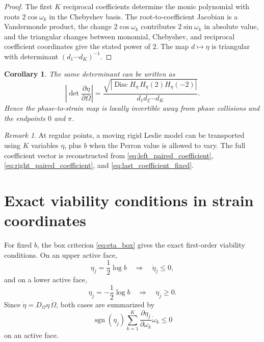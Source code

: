 \documentclass[11pt]{amsart}
\numberwithin{equation}{section}
\theoremstyle{plain}
\newtheorem{corollary}[theorem]{Corollary}
\theoremstyle{definition}
\theoremstyle{remark}
\newtheorem{remark}[theorem]{Remark}
\begin{document}
\begin{proof}
The first $K$ reciprocal coefficients determine the monic polynomial with roots $2\cos\omega_k$ in the Chebyshev basis.  The root-to-coefficient Jacobian is a Vandermonde product, the change $2\cos\omega_k$ contributes $2\sin\omega_k$ in absolute value, and the triangular changes between monomial, Chebyshev, and reciprocal coefficient coordinates give the stated power of $2$.  The map $d\mapsto\eta$ is triangular with determinant $(d_1\cdots d_K)^{-1}$.
\end{proof}

\begin{corollary}
\label{cor:discriminant_jacobian}
The same determinant can be written as
\begin{equation}
\left|
\det\frac{\partial\eta}{\partial\Omega}
\right|
=
\frac{
\sqrt{\left|
\operatorname{Disc}H_\eta\,
H_\eta(2)H_\eta(-2)
\right|}
}{d_1d_2\cdots d_K}.
\label{eq:eta_jacobian_discriminant}
\end{equation}
Hence the phase-to-strain map is locally invertible away from phase collisions and the endpoints $0$ and $\pi$.
\end{corollary}

\begin{remark}
\label{rem:reduced_transport_coordinates}
At regular points, a moving rigid Leslie model can be transported using $K$ variables $\eta$, plus $b$ when the Perron value is allowed to vary.  The full coefficient vector is reconstructed from \eqref{eq:left_paired_coefficient}, \eqref{eq:right_paired_coefficient}, and \eqref{eq:last_coefficient_fixed}.
\end{remark}

\section{Exact viability conditions in strain coordinates}
\label{sec:eta_viability}

For fixed $b$, the box criterion \eqref{eq:eta_box} gives the exact first-order viability conditions.  On an upper active face,
\begin{equation}
\eta_j=\frac12\log b
\quad\Longrightarrow\quad
\dot\eta_j\leq0,
\label{eq:upper_face_velocity}
\end{equation}
and on a lower active face,
\begin{equation}
\eta_j=-\frac12\log b
\quad\Longrightarrow\quad
\dot\eta_j\geq0.
\label{eq:lower_face_velocity}
\end{equation}
Since $\dot\eta=D_\Omega\eta\,\dot\Omega$, both cases are summarized by
\begin{equation}
\operatorname{sgn}(\eta_j)
\sum_{k=1}^{K}
\frac{\partial\eta_j}{\partial\omega_k}
\dot\omega_k
\leq0
\label{eq:phase_velocity_face_condition}
\end{equation}
on an active face.
\end{document}
